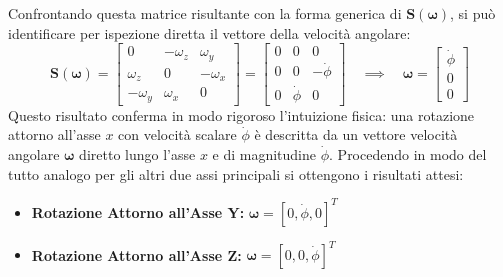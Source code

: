 ﻿\documentclass[11pt, a4paper]{article}
\begin{document}
Confrontando questa matrice risultante con la forma generica di \(\bm{S}(\bm{\omega})\), si può identificare per ispezione diretta il vettore della velocità angolare:
\[
    \bm{S}(\bm{\omega}) = \begin{bmatrix}
        0 & -\omega_z & \omega_y \\
        \omega_z & 0 & -\omega_x \\
        -\omega_y & \omega_x & 0
    \end{bmatrix}
    =
    \begin{bmatrix}
        0 & 0 & 0 \\
        0 & 0 & -\dot{\phi} \\
        0 & \dot{\phi} & 0
    \end{bmatrix}
    \quad \implies \quad
    \bm{\omega} = \begin{bmatrix} \dot{\phi} \\ 0 \\ 0 \end{bmatrix}
\]
Questo risultato conferma in modo rigoroso l'intuizione fisica: una rotazione attorno all'asse \(x\) con velocità scalare \(\dot{\phi}\) è descritta da un vettore velocità angolare \(\bm{\omega}\) diretto lungo l'asse \(x\) e di magnitudine \(\dot{\phi}\). Procedendo in modo del tutto analogo per gli altri due assi principali si ottengono i risultati attesi:
\begin{itemize}
    \item \textbf{Rotazione Attorno all'Asse Y:} \quad \(\bm{\omega} = [0, \dot{\phi}, 0]^T\)
    \item \textbf{Rotazione Attorno all'Asse Z:} \quad \(\bm{\omega} = [0, 0, \dot{\phi}]^T\)
\end{itemize}

\newpage
\end{document}
